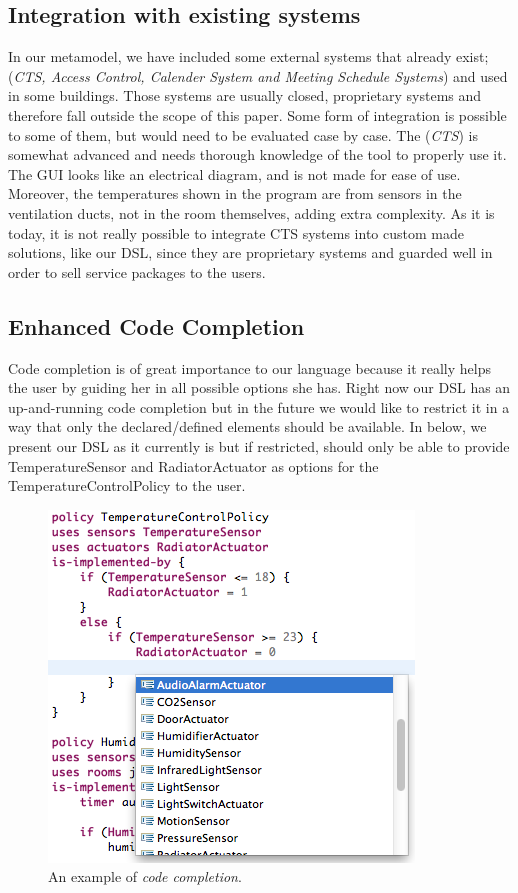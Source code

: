 \documentclass{llncs}
\begin{document}
\subsection{Integration with existing systems}\label{subsec:integration}
In our metamodel, we have included some external systems that already exist; (\textit{CTS, Access Control, Calender System and Meeting Schedule Systems}) and used in some buildings. Those systems are usually closed, proprietary systems and therefore fall outside the scope of this paper. Some form of integration is possible to some of them, but would need to be evaluated case by case. The (\textit{CTS}) is somewhat advanced and needs thorough knowledge of the tool to properly use it. The GUI looks like an electrical diagram, and is not made for ease of use. Moreover, the temperatures shown in the program are from sensors in the ventilation ducts, not in the room themselves, adding extra complexity. As it is today, it is not really possible to integrate CTS systems into custom made solutions, like our DSL, since they are proprietary systems and guarded well in order to sell service packages to the users.

\subsection{Enhanced Code Completion}\label{subsec:codecompletion}
Code completion is of great importance to our language because it really helps the user by guiding her in all possible options she has. Right now our DSL has an up-and-running code completion but in the future we would like to restrict it in a way that only the declared/defined elements should be available. In  below, we present our DSL as it currently is but if restricted, should only be able to provide TemperatureSensor and RadiatorActuator as options for the TemperatureControlPolicy to the user.

\begin{figure}
  \centering
    \includegraphics[scale=.5]{dsl-code-completion.png} 
	\caption{An example of \textit{code completion}.}
	\label{fig:code-completion}
\end{figure}
\end{document}
